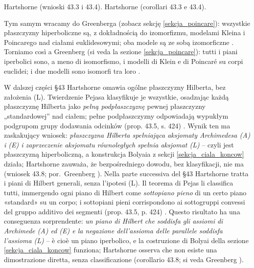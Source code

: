 Hartshorne \cite[s. 422]{hartshorne_2000} (wnioski 43.3 i 43.4). %
Hartshorne \cite[p. 422]{hartshorne_2000} (corollari 43.3 e 43.4). %

Tym samym wracamy do Greenberga (zobacz sekcję \ref{sekcja_poincare}): wszystkie płaszczyzny hiperboliczne są, z dokładnością do izomorfizmu, modelami Kleina i Poincarego nad ciałami euklidesowymi; oba modele są ze sobą izomorficzne \cite[s. 209]{greenberg_2010}. %
Torniamo così a Greenberg (si veda la sezione \ref{sekcja_poincare}): tutti i piani iperbolici sono, a meno di isomorfismo, i modelli di Klein e di Poincaré su corpi euclidei; i due modelli sono isomorfi tra loro \cite[p. 209]{greenberg_2010}. %

W dalszej części §43 Hartshorne omawia ogólne płaszczyzny Hilberta, bez założenia (L). %
Twierdzenie Pejasa klasyfikuje je wszystkie, osadzając każdą płaszczyznę Hilberta jako \emph{pełną podpłaszczyznę} pewnej płaszczyzny „standardowej'' nad ciałem; pełne podpłaszczyzny odpowiadają wypukłym podgrupom grupy dodawania odcinków (prop. 43.5, s. 424) \cite[s. 424--426]{hartshorne_2000}. %
Wynik ten ma zaskakujący wniosek: \emph{płaszczyzna Hilberta spełniająca aksjomaty Archimedesa (A) i (E) i zaprzeczenie aksjomatu równoległych spełnia aksjomat (L)} -- czyli jest płaszczyzną hiperboliczną, a konstrukcja Bolyaia z sekcji \ref{sekcja_ciala_koncow} działa; Hartshorne zauważa, że bezpośredniego dowodu, bez klasyfikacji, nie ma \cite[s. 426]{hartshorne_2000} (wniosek 43.8; por.~Greenberg \cite[s. 210]{greenberg_2010}). %
Nella parte successiva del §43 Hartshorne tratta i piani di Hilbert generali, senza l'ipotesi (L). %
Il teorema di Pejas li classifica tutti, immergendo ogni piano di Hilbert come \emph{sottopiano pieno} di un certo piano «standard» su un corpo; i sottopiani pieni corrispondono ai sottogruppi convessi del gruppo additivo dei segmenti (prop. 43.5, p. 424) \cite[p. 424--426]{hartshorne_2000}. %
Questo risultato ha una conseguenza sorprendente: \emph{un piano di Hilbert che soddisfa gli assiomi di Archimede (A) ed (E) e la negazione dell'assioma delle parallele soddisfa l'assioma (L)} -- è cioè un piano iperbolico, e la costruzione di Bolyai della sezione \ref{sekcja_ciala_koncow} funziona; Hartshorne osserva che non esiste una dimostrazione diretta, senza classificazione \cite[p. 426]{hartshorne_2000} (corollario 43.8; si veda Greenberg \cite[p. 210]{greenberg_2010}). %
%

